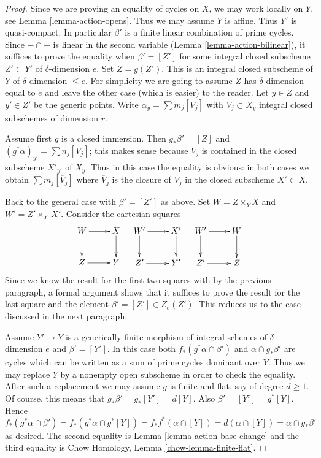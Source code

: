 \documentclass{stacks-project}
\theoremstyle{plain}
\theoremstyle{definition}
\theoremstyle{remark}
\numberwithin{equation}{subsection}
\begin{document}
\begin{proof}
Since we are proving an equality of cycles on $X$, we may work locally
on $Y$, see Lemma \ref{lemma-action-opens}. Thus we may assume $Y$
is affine. Thus $Y'$ is quasi-compact. In particular $\beta'$
is a finite linear combination of prime cycles.
Since $- \cap -$ is linear in the second variable
(Lemma \ref{lemma-action-bilinear}), it suffices
to prove the equality when $\beta' = [Z']$ for some integral closed subscheme
$Z' \subset Y'$ of $\delta$-dimension $e$. Set $Z = g(Z')$. This is
an integral closed subscheme of $Y$ of $\delta$-dimension $\leq e$.
For simplicity we are going to assume $Z$ has $\delta$-dimension 
equal to $e$ and leave the other case (which is easier) to the reader.
Let $y \in Z$ and $y' \in Z'$ be the generic points.
Write $\alpha_y = \sum m_j[V_j]$ with $V_j \subset X_y$
integral closed subschemes of dimension $r$.

\medskip\noindent
Assume first $g$ is a closed immersion. Then $g_*\beta' = [Z]$
and $(g^*\alpha)_{y'} = \sum n_j[V_j]$; this makes sense because
$V_j$ is contained in the closed subscheme $X'_{y'}$ of $X_y$.
Thus in this case the equality is obvious: in both cases
we obtain $\sum m_j[\overline{V}_j]$ where $\overline{V}_j$
is the closure of $V_j$ in the closed subscheme $X' \subset X$.

\medskip\noindent
Back to the general case with $\beta' = [Z']$ as above.
Set $W = Z \times_Y X$ and $W' = Z' \times_{Y'} X'$.
Consider the cartesian squares
$$
\xymatrix{
W \ar[r] \ar[d] & X \ar[d] \\
Z \ar[r] & Y
}
\quad
\xymatrix{
W' \ar[r] \ar[d] & X' \ar[d] \\
Z' \ar[r] & Y'
}
\quad
\xymatrix{
W' \ar[r] \ar[d] & W \ar[d] \\
Z' \ar[r] & Z
}
$$
Since we know the result for the first two squares with by the
previous paragraph, a formal argument shows that it suffices
to prove the result for the last square and the element
$\beta' = [Z'] \in Z_e(Z')$. This reduces us to the case discussed
in the next paragraph.

\medskip\noindent
Assume $Y' \to Y$ is a generically finite morphism of integral schemes
of $\delta$-dimension $e$ and $\beta' = [Y']$. In this case both
$f_*(g^*\alpha \cap \beta')$ and $\alpha \cap g_*\beta'$ are cycles
which can be written as a sum of prime cycles dominant over $Y$.
Thus we may replace $Y$ by a nonempty open subscheme in order to
check the equality. After such a replacement we may assume $g$ is
finite and flat, say of degree $d \geq 1$. Of course, this means
that $g_*\beta' = g_*[Y'] = d[Y]$. Also $\beta' = [Y'] = g^*[Y]$. Hence
$$
f_*(g^*\alpha \cap \beta') =
f_*(g^*\alpha \cap g^*[Y]) =
f_*f^*(\alpha \cap [Y]) =
d (\alpha \cap [Y]) =
\alpha \cap g_*\beta'
$$
as desired. The second equality is Lemma \ref{lemma-action-base-change}
and the third equality is Chow Homology, Lemma \ref{chow-lemma-finite-flat}.
\end{proof}
\end{document}
